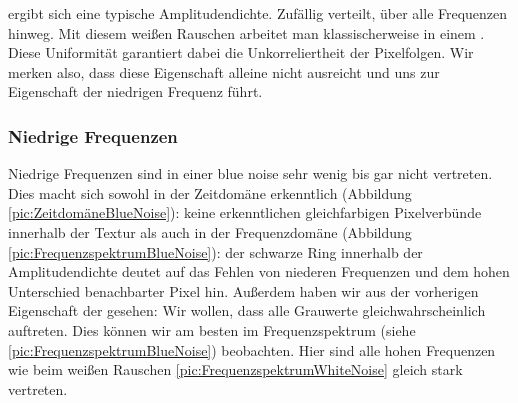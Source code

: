ergibt sich eine typische Amplitudendichte. Zufällig verteilt, über alle 
Frequenzen hinweg. Mit diesem weißen Rauschen arbeitet man klassischerweise in einem .
Diese Uniformität garantiert dabei die Unkorreliertheit der Pixelfolgen. Wir merken also, dass 
diese Eigenschaft alleine nicht ausreicht und uns zur Eigenschaft der niedrigen Frequenz führt.

\subsubsection{Niedrige Frequenzen}
\label{ch:Content1:sec:blue noise:Niedrige Frequenzen}
Niedrige Frequenzen sind in einer blue noise sehr wenig bis gar nicht 
vertreten. Dies macht sich sowohl in der Zeitdomäne erkenntlich (Abbildung \ref{pic:ZeitdomäneBlueNoise}): keine erkenntlichen gleichfarbigen Pixelverbünde 
innerhalb der Textur als auch in der Frequenzdomäne (Abbildung \ref{pic:FrequenzspektrumBlueNoise}): der schwarze Ring innerhalb der Amplitudendichte
deutet auf das Fehlen von niederen Frequenzen und dem hohen Unterschied benachbarter Pixel hin.
Außerdem haben wir aus der vorherigen Eigenschaft der  gesehen:
Wir wollen, dass alle Grauwerte gleichwahrscheinlich auftreten. Dies können wir am besten im Frequenzspektrum 
(siehe \ref{pic:FrequenzspektrumBlueNoise})
beobachten. Hier sind alle hohen Frequenzen wie beim weißen Rauschen \ref{pic:FrequenzspektrumWhiteNoise} gleich stark vertreten.

